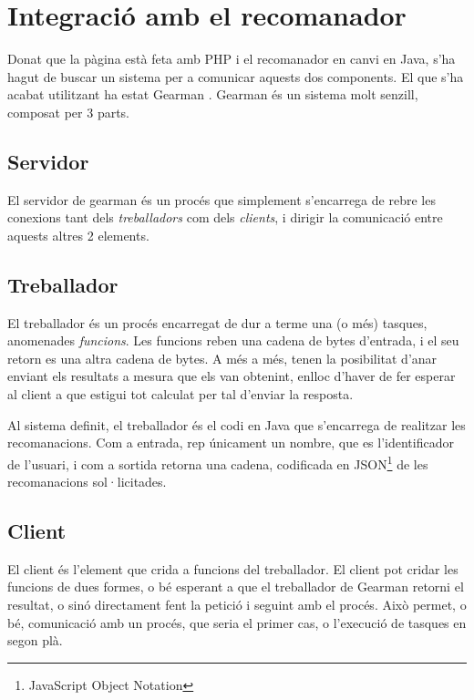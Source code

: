 \section{Integració amb el recomanador}

Donat que la pàgina està feta amb PHP i el recomanador en canvi en Java, s'ha hagut de buscar un sistema per a comunicar aquests dos components. El que s'ha acabat utilitzant ha estat Gearman \cite{gearman-web}. Gearman és un sistema molt senzill, composat per 3 parts.

\subsection{Servidor}

El servidor de gearman és un procés que simplement s'encarrega de rebre les conexions tant dels \emph{treballadors} com dels \emph{clients}, i dirigir la comunicació entre aquests altres 2 elements.

\subsection{Treballador}

El treballador és un procés encarregat de dur a terme una (o més) tasques, anomenades \emph{funcions}. Les funcions reben una cadena de bytes d'entrada, i el seu retorn es una altra cadena de bytes. A més a més, tenen la posibilitat d'anar enviant els resultats a mesura que els van obtenint, enlloc d'haver de fer esperar al client a que estigui tot calculat per tal d'enviar la resposta.

Al sistema definit, el treballador és el codi en Java que s'encarrega de realitzar les recomanacions. Com a entrada, rep únicament un nombre, que es l'identificador de l'usuari, i com a sortida retorna una cadena, codificada en JSON\footnote{JavaScript Object Notation} de les recomanacions sol·licitades.

\subsection{Client}

El client és l'element que crida a funcions del treballador. El client pot cridar les funcions de dues formes, o bé esperant a que el treballador de Gearman retorni el resultat, o sinó directament fent la petició i seguint amb el procés. Això permet, o bé, comunicació amb un procés, que seria el primer cas, o l'execució de tasques en segon plà.

